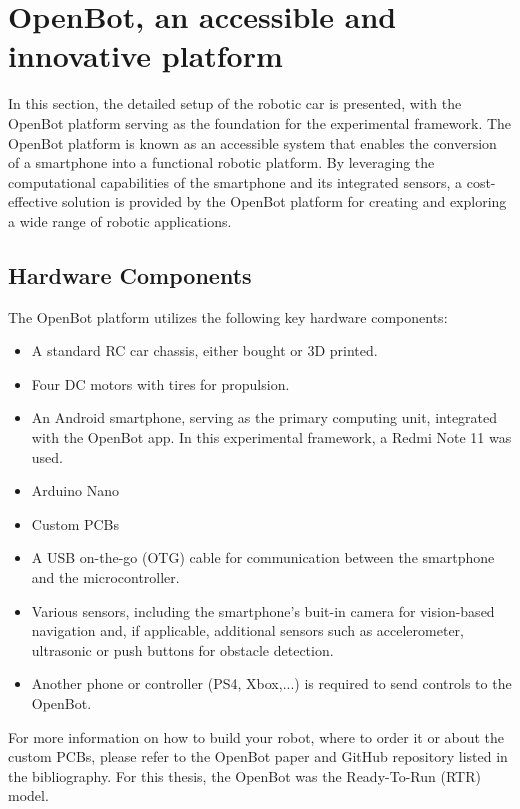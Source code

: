 \documentclass[12pt]{report}
\begin{document}
\section{OpenBot, an accessible and innovative platform}
\label{sub:Openbot_accessible}
In this section, the detailed setup of the robotic car is presented, with the OpenBot platform \cite{bib:openbot} serving as the foundation for the experimental framework. The OpenBot platform is known as an accessible system that enables the conversion of a smartphone into a functional robotic platform. By leveraging the computational capabilities of the smartphone and its integrated sensors, a cost-effective solution is provided by the OpenBot platform for creating and exploring a wide range of robotic applications.

\subsection{Hardware Components}
\label{sub:Hardware_Components}

The OpenBot platform utilizes the following key hardware components:
\begin{itemize}
    \item A standard RC car chassis, either bought or 3D printed. 
    \item Four DC motors with tires for propulsion.
    \item An Android smartphone, serving as the primary computing unit, integrated with the OpenBot app. In this experimental framework, a Redmi Note 11 \cite{bib:phone} was used.
    \item Arduino Nano
    \item Custom PCBs
    \item A USB on-the-go (OTG) cable for communication between the smartphone and the microcontroller.
    \item Various sensors, including the smartphone's buit-in camera for vision-based navigation and, if applicable, additional sensors such as accelerometer, ultrasonic or push buttons for obstacle detection.
    \item Another phone or controller (PS4, Xbox,...) is required to send controls to the OpenBot.
\end{itemize}

For more information on how to build your robot, where to order it or about the custom PCBs, please refer to the OpenBot paper \cite{bib:openbot} and GitHub repository \cite{bib:git_openbot} listed in the bibliography. For this thesis, the OpenBot was the Ready-To-Run (RTR) model. 
\end{document}
